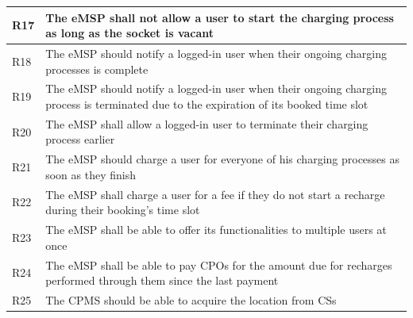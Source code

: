 \documentclass[11pt]{article}
\begin{document}
\begin{table}[H]
\begin{tabularx}{\textwidth}{|>{\centering\hsize=0.1\hsize}X|>{\hsize=1.9\hsize}X|}
        \hline
        R17 & The eMSP shall not allow a user to start the charging process as long as the socket is vacant \\
        \hline
        R18 & The eMSP should notify a logged-in user when their ongoing charging processes is complete \\
        \hline
        R19 & The eMSP should notify a logged-in user when their ongoing charging process is terminated due to the expiration of its booked time slot \\
        \hline
        R20 & The eMSP shall allow a logged-in user to terminate their charging process earlier \\
        \hline
        R21 & The eMSP should charge a user for everyone of his charging processes as soon as they finish \\
        \hline
        R22 & The eMSP shall charge a user for a fee if they do not start a recharge during their booking's time slot \\
        \hline
        R23 & The eMSP shall be able to offer its functionalities to multiple users at once \\
        \hline
        R24 & The eMSP shall be able to pay CPOs for the amount due for recharges performed through them since the last payment \\
        \hline
        R25 & The CPMS should be able to acquire the location from CSs \\
        \hline
    \end{tabularx}
    \label{tab:requirements}
\end{table}
\end{document}

